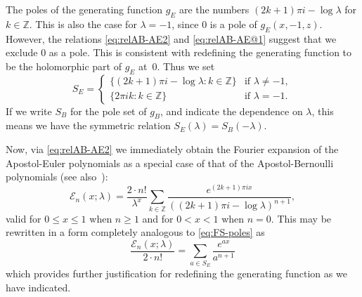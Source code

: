 \documentclass[11pt,a4paper]{amsart}
\newcommand{\Z}{\mathbb{Z}}
\newcommand{\E}{\mathcal{E}}
\theoremstyle{plain}
\theoremstyle{remark}
\begin{document}
The poles of the generating function $g_{E}$ are the numbers $(2k + 1)\pi i - \log\lambda$ for $k \in \Z$. This is also the case for $\lambda = -1$, since $0$ is a pole of $g_{E}(x,-1,z)$.
However, the relations \eqref{eq:relAB-AE2} and \eqref{eq:relAB-AE@1} suggest that we exclude $0$ as a pole. This is consistent with redefining the generating function to be the holomorphic part of $g_{E}$ at~$0$. Thus we set
$$
	S_{E} = \begin{cases}
			\{ (2k + 1) \pi i - \log\lambda : k \in \Z \} & \text{if $\lambda \neq -1$},
			\\
			\{ 2 \pi i k : k \in \Z \} & \text{if $\lambda = -1$}.
			\end{cases}
$$
If we write $S_{B}$ for the pole set of $g_{B}$, and indicate the dependence on $\lambda$, this means we have the symmetric relation $S_{E}(\lambda) = S_{B}(-\lambda)$.


Now, via \eqref{eq:relAB-AE2} we immediately obtain the Fourier expansion of the Apostol-Euler polynomials as a special case of that of the Apostol-Bernoulli polynomials (see also~\cite{Luo-MC}):
%
\begin{equation}
\label{eq:FS-EB}
    \E_n(x;\lambda) 
  = \frac{2 \cdot n!}{\lambda^x} \sum_{k \in \Z} 
    \frac{e^{(2k+1)\pi i x}}{((2k+1)\pi i - \log \lambda)^{n+1}},
\end{equation}
%
valid for $0 \le x \le 1$ when $n \ge 1$ and for $0 < x < 1$ when $n = 0$.
This may be rewritten in a form completely analogous to \eqref{eq:FS-poles} as
%
\begin{equation}
\label{eq:FS-AE-poles}
	\frac{\E_n(x;\lambda)}{2 \cdot n!} = \sum_{a \in S_{E}} \frac{e^{ax}}{a^{n+1}}
\end{equation}
%
which provides further justification for redefining the generating function as we have indicated.
\end{document}
